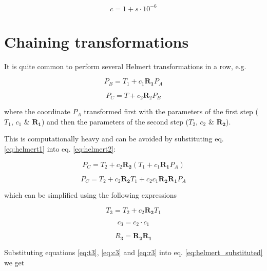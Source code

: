 \documentclass[11pt,twocolumn]{article}
\newcommand{\matr}[1]{\mathbf{#1}}
\begin{document}
\begin{equation}
    c = 1+s\cdot10^{-6}
\end{equation}

\section{Chaining transformations}

It is quite common to perform several Helmert transformations
in a row, e.g.

\begin{equation}
    \label{eq:helmert1}
    P_B = T_1 + c_1\matr{R_1}P_A
\end{equation}

\begin{equation}
    \label{eq:helmert2}
    P_C = T + c_2\matr{R}_2P_B
\end{equation}

where the coordinate $P_A$ transformed first with the parameters of the first
step ($T_1$, $c_1$ \& $\matr{R_1}$) and then the parameters of the second step
($T_2$, $c_2$ \& $\matr{R_2}$).

This is computationally heavy and can be avoided by
substituting eq. \ref{eq:helmert1} into eq. \ref{eq:helmert2}:

\begin{equation}
    P_C = T_2 + c_2\matr{R_2} \left( T_1 + c_1 \matr{R_1} P_A \right)
\end{equation}

\begin{equation}
    \label{eq:helmert_substituted}
    P_C = T_2 + c_2\matr{R_2}T_1 + c_2c_1 \matr{R_2}\matr{R_1} P_A
\end{equation}

which can be simplified using the following expressions

\begin{equation}
    \label{eq:t3}
    T_3 = T_2 + c_2\matr{R_2}T_1
\end{equation}

\begin{equation}
    \label{eq:c3}
    c_3 = c_2 \cdot c_1
\end{equation}

\begin{equation}
    \label{eq:r3}
    R_3 = \matr{R_2}\matr{R_1}
\end{equation}

Substituting equations \ref{eq:t3}, \ref{eq:c3} and \ref{eq:r3} into
eq. \ref{eq:helmert_substituted} we get
\end{document}
